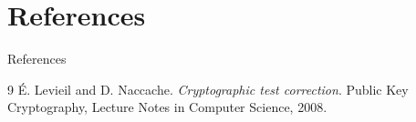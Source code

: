 \documentclass[10pt, aspectratio=169]{beamer}
\begin{document}
\section{References}
\begin{frame}{References}
    \begin{thebibliography}{9}
        É. Levieil and D. Naccache.
        \textit{Cryptographic test correction}. 
        Public Key Cryptography, Lecture Notes in Computer Science, 2008.
    \end{thebibliography}
\end{frame}
\end{document}
